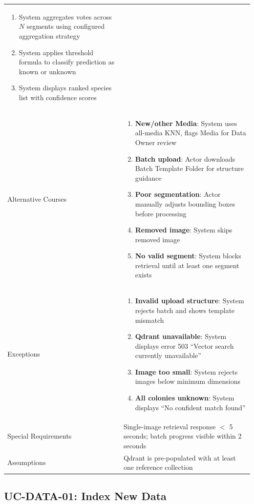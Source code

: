 \begin{table}[H]
\begin{tabularx}{\textwidth}{@{}p{3cm} X@{}}
\begin{enumerate}[nosep]
  \item System aggregates votes across $N$ segments using configured aggregation strategy
  \item System applies threshold formula to classify prediction as known or unknown
  \item System displays ranked species list with confidence scores
\end{enumerate} \\
Alternative Courses &
\begin{enumerate}[nosep]
  \item \textbf{New/other Media}: System uses all-media KNN, flags Media for Data Owner review
  \item \textbf{Batch upload}: Actor downloads Batch Template Folder for structure guidance
  \item \textbf{Poor segmentation}: Actor manually adjusts bounding boxes before processing
  \item \textbf{Removed image}: System skips removed image
  \item \textbf{No valid segment}: System blocks retrieval until at least one segment exists
\end{enumerate} \\
Exceptions &
\begin{enumerate}[nosep]
  \item \textbf{Invalid upload structure}: System rejects batch and shows template mismatch
  \item \textbf{Qdrant unavailable}: System displays error 503 ``Vector search currently unavailable''
  \item \textbf{Image too small}: System rejects images below minimum dimensions
  \item \textbf{All colonies unknown}: System displays ``No confident match found''
\end{enumerate} \\
Special Requirements & Single-image retrieval response $<$ 5 seconds; batch progress visible within 2 seconds \\
Assumptions & Qdrant is pre-populated with at least one reference collection \\
\bottomrule
\end{tabularx}
\end{table}

\subsection{UC-DATA-01: Index New Data}

